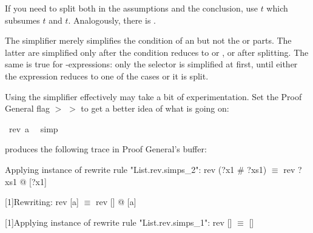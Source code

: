 \begin{isabellebody}
\begin{isamarkuptxt}
\begin{isabelle}
\end{isabelle}
If you need to split both in the assumptions and the conclusion,
use $t$ which subsumes $t$ and
$t$. Analogously, there is .

\begin{warn}
  The simplifier merely simplifies the condition of an 
   but not the
   or  parts. The latter are simplified only after the
  condition reduces to  or , or after splitting. The
  same is true for -expressions: only the selector is
  simplified at first, until either the expression reduces to one of the
  cases or it is split.
\end{warn}%
\end{isamarkuptxt}%
\isamarkuptrue%
%
\endisatagproof
{\isafoldproof}%
%
\isadelimproof
%
\endisadelimproof
%
\isamarkuptrue%
%
\begin{isamarkuptext}%
Using the simplifier effectively may take a bit of experimentation.  Set the
Proof General flag  $>$  $>$  to get a better idea of what is going on:%
\end{isamarkuptext}%
\isamarkuptrue%
\isamarkupfalse%
\ {}rev\ {}a{}\ {}\ {}{}{}\isanewline
%
\isadelimproof
%
\endisadelimproof
%
\isatagproof
{}\isamarkupfalse%
{}simp{}%
\endisatagproof
{\isafoldproof}%
%
\isadelimproof
%
\endisadelimproof
%
\begin{isamarkuptext}%
\noindent
produces the following trace in Proof General's  buffer:

\begin{ttbox}\makeatother
[1]Applying instance of rewrite rule "List.rev.simps_2":
rev (?x1 # ?xs1) \(\equiv\) rev ?xs1 @ [?x1]

[1]Rewriting:
rev [a] \(\equiv\) rev [] @ [a]

[1]Applying instance of rewrite rule "List.rev.simps_1":
rev [] \(\equiv\) []


\end{ttbox}
\end{isamarkuptext}
\end{isabellebody}
